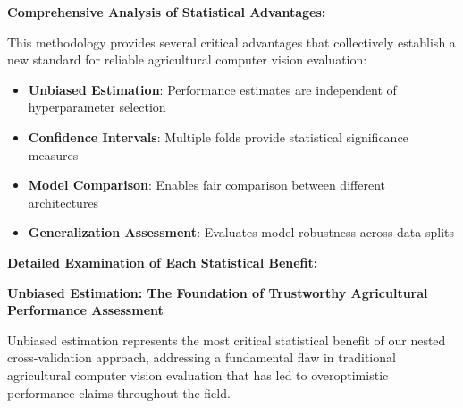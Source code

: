 \textbf{Comprehensive Analysis of Statistical Advantages:}

This methodology provides several critical advantages that collectively establish a new standard for reliable agricultural computer vision evaluation:

\begin{itemize}
    \item \textbf{Unbiased Estimation}: Performance estimates are independent of hyperparameter selection
    \item \textbf{Confidence Intervals}: Multiple folds provide statistical significance measures
    \item \textbf{Model Comparison}: Enables fair comparison between different architectures
    \item \textbf{Generalization Assessment}: Evaluates model robustness across data splits
\end{itemize}

\textbf{Detailed Examination of Each Statistical Benefit:}

\textbf{Unbiased Estimation: The Foundation of Trustworthy Agricultural Performance Assessment}

Unbiased estimation represents the most critical statistical benefit of our nested cross-validation approach, addressing a fundamental flaw in traditional agricultural computer vision evaluation that has led to overoptimistic performance claims throughout the field.

